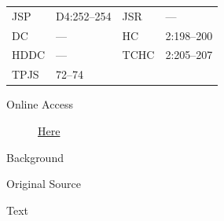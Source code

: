 				\begin{tabular}{p{0.5in}p{1in}p{0.5in}p{1in}}
				JSP	 	& D4:252--254		& JSR 		& --- \\
				DC	 	& --- 				& HC 		& 2:198--200 \\
				HDDC 	& ---				& TCHC 		& 2:205--207 \\
				TPJS 	& 72--74			& 	 		&  \\
				\end{tabular}
			
			\begin{description}
				\item[Online Access] \href{https://www.josephsmithpapers.org/paper-summary/minutes-and-discourses-27-february-1835-as-reported-by-oliver-cowdery/1}{Here}
			\end{description}
			
			\begin{description}
				\item[Background]
			\end{description}
			
			
			\begin{description}
				\item[Original Source]
			\end{description}
			
			
			\begin{description}
				\item[Text]
			\end{description}
			

